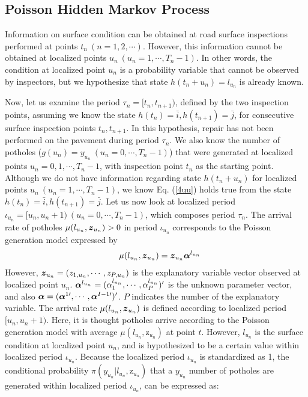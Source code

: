 \documentclass[Journal]{ascelike}
\begin{document}
\subsection{Poisson Hidden Markov Process}\label{sub23}
Information on surface condition can be obtained at road surface inspections performed at points $t_n~(n=1,2,\cdots)$. However, this information cannot be obtained at localized points $u_n~(u_n=1,\cdots,T_n-1)$. In other words, the condition at localized point $u_n$ is a probability variable that cannot be observed by inspectors, but we hypothesize that state $h(t_n+u_n)=l_{u_n}$ is already known.

Now, let us examine the period $\tau_n=[t_n,t_{n+1})$, defined by the two inspection points, assuming we know the state $h(t_n)=\bar{i},h(t_{n+1})=\bar{j}$, for consecutive surface inspection points $t_n,t_{n+1}$. In this hypothesis, repair has not been performed on the pavement during period $\tau_n$. We also know the number of potholes ($g(u_n)=y_{u_n}~(u_n=0,\cdots,T_n-1)$) that were generated at localized points $u_n=0,1,\cdots,T_n-1$, with inspection point $t_n$ as the starting point. Although we do not have information regarding state $h(t_n+u_n)$ for localized points $u_n~(u_n=1,\cdots,T_n-1)$, we know Eq. (\ref{4uu}) holds true from the state $h(t_n)=\bar{i},h(t_{n+1})=\bar{j}$. Let us now look at localized period $\iota_{u_n}=[u_n,u_n+1)~(u_n=0,\cdots,T_n-1)$, which composes period $\tau_n$. The arrival rate of potholes $\mu(l_{u_n},\mbox{\boldmath$z$}_{u_n})>0$ in period $\iota_{u_n}$ corresponds to the Poisson generation model expressed by
\begin{eqnarray}
&& \mu(l_{u_n},\mbox{\boldmath$z$}_{u_n})= \mbox{\boldmath$z$}_{u_n}\mbox{\boldmath$\alpha$}^{l_{u_n}}      \label{4(19)}
\end{eqnarray}
However, $\mbox{\boldmath$z$}_{u_n}=(z_{1,u_n},\cdots,z_{P,u_n})$ is the explanatory variable vector observed at localized point $u_n$. $\mbox{\boldmath$\alpha$}^{l_{u_n}}=(\alpha_1^{l_{u_n}},\cdots,\alpha_{P}^{l_{u_n}})^\prime$ is the unknown parameter vector, and also $\mbox{\boldmath$\alpha$}=(\mbox{\boldmath$\alpha$}^{1\prime},\cdots,\mbox{\boldmath$\alpha$}^{I-1\prime})^\prime$. $P$ indicates the number of the explanatory variable. The arrival rate $\mu(l_{u_n},\mbox{\boldmath$z$}_{u_n})$ is defined according to localized period $[u_n,u_n+1)$. Here, it is thought potholes arrive according to the Poisson generation model with average $\mu(l_{u_n},\mbox{z}_{u_n})$ at point $t$. However, $l_{u_n}$ is the surface condition at localized point $u_n$, and is hypothesized to be a certain value within localized period $\iota_{u_n}$. Because the localized period $\iota_{u_n}$ is standardized as 1, the conditional probability $\pi(y_{u_n}|l_{u_n},\mbox{z}_{u_n})$ that a $y_{u_n}$ number of potholes are generated within localized period $\iota_{u_n}$, can be expressed as:
\end{document}
